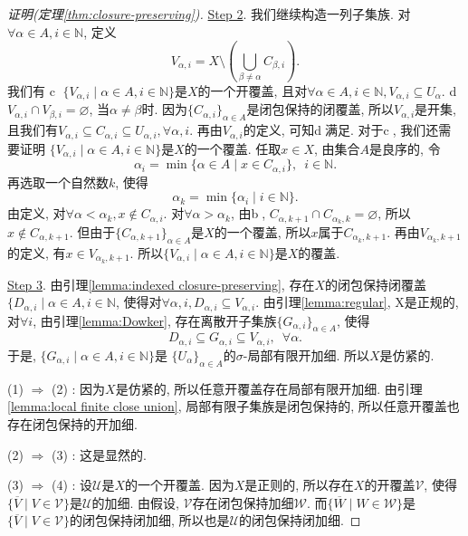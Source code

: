 \documentclass[a4paper,UTF8]{ctexart}
\begin{document}
\begin{proof}[证明(定理\ref{thm:closure-preserving})]
  \underline{Step 2}.
  我们继续构造一列子集族. 对$\forall \alpha \in A, i \in \mathbb{N}$, 定义
  \[
    V_{\alpha, i} = X \setminus (\bigcup_{\beta \neq \alpha} C_{\beta, i}).
  \]
  我们有\newline
  \textcircled{c}
    $\{ V_{\alpha, i} \mid \alpha \in A, i \in \mathbb{N} \}$是$X$的一个开覆盖,
    且对$\forall \alpha \in A, i \in \mathbb{N}, V_{\alpha, i} \subseteq U_\alpha$. \newline
  \textcircled{d}
    $V_{\alpha, i} \cap V_{\beta, i} = \varnothing$, 当$\alpha \neq \beta$时. \newline
  因为$\{ C_{\alpha, i} \}_{\alpha \in A}$是闭包保持的闭覆盖, 所以$V_{\alpha, i}$是开集,
  且我们有$V_{\alpha, i} \subseteq C_{\alpha, i} \subseteq U_{\alpha, i}, \forall \alpha, i$.
  再由$V_{\alpha, i}$的定义, 可知\textcircled{d}满足.
  对于\textcircled{c}, 我们还需要证明
  $\{ V_{\alpha, i} \mid \alpha \in A, i \in \mathbb{N} \}$是$X$的一个覆盖.
  任取$x \in X$, 由集合$A$是良序的, 令
  \[
    \alpha_i = \min \{ \alpha \in A \mid x \in C_{\alpha, i} \}, \,\,\, i \in \mathbb{N}.
  \]
  再选取一个自然数$k$, 使得
  \[
    \alpha_k = \min \{ \alpha_i \mid i \in \mathbb{N} \}.
  \]
  由定义, 对$\forall \alpha < \alpha_k, x \notin C_{\alpha, i}$.
  对$\forall \alpha > \alpha_k$, 由\textcircled{b},
  $C_{\alpha, k+1} \cap C_{\alpha_k, k} = \varnothing$,
  所以$x \notin C_{\alpha, k+1}$. 但由于$\{ C_{\alpha, k+1} \}_{\alpha \in A}$是$X$的一个覆盖,
  所以$x$属于$C_{\alpha_k, k+1}$. 再由$V_{\alpha_k, k+1}$的定义,
  有$x \in V_{\alpha_k, k+1}$.
  所以$\{ V_{\alpha, i} \mid \alpha \in A, i \in \mathbb{N} \}$是$X$的覆盖.

  \underline{Step 3}.
  由引理\ref{lemma:indexed closure-preserving},
  存在$X$的闭包保持闭覆盖$\{ D_{\alpha, i} \mid \alpha \in A, i \in \mathbb{N}$,
  使得对$\forall \alpha, i, D_{\alpha, i} \subseteq V_{\alpha, i}$.
  由引理\ref{lemma:regular}, X是正规的, 对$\forall i$, 由引理\ref{lemma:Dowker},
  存在离散开子集族$\{ G_{\alpha, i} \}_{\alpha \in A}$, 使得
  \[
    D_{\alpha, i} \subseteq G_{\alpha, i} \subseteq V_{\alpha, i}, \,\,\, \forall \alpha.
  \]
  于是, $\{ G_{\alpha, i} \mid \alpha \in A, i \in \mathbb{N} \}$是
  $\{ U_\alpha \}_{\alpha \in A}$的$\sigma$-局部有限开加细. 所以$X$是仿紧的.

  (1) $\Rightarrow$ (2) :
  因为$X$是仿紧的, 所以任意开覆盖存在局部有限开加细.
  由引理\ref{lemma:local finite close union}, 局部有限子集族是闭包保持的,
  所以任意开覆盖也存在闭包保持的开加细.

  (2) $\Rightarrow$ (3) :
  这是显然的.

  (3) $\Rightarrow$ (4) :
  设$\mathscr{U}$是$X$的一个开覆盖.
  因为$X$是正则的, 所以存在$X$的开覆盖$\mathscr{V}$, 使得
  $\{ \overline{V} \mid V \in \mathscr{V} \}$是$\mathscr{U}$的加细.
  由假设, $\mathscr{V}$存在闭包保持加细$\mathscr{W}$.
  而$\{ \overline{W} \mid W \in \mathscr{W} \}$是
  $\{ \overline{V} \mid V \in \mathscr{V} \}$的闭包保持闭加细,
  所以也是$\mathscr{U}$的闭包保持闭加细.
\end{proof}
\end{document}
